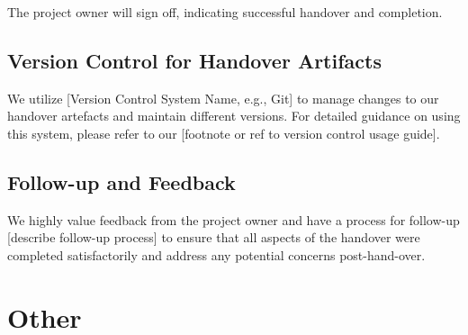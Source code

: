\documentclass[10pt]{projectdoc}
\begin{document}
The project owner will sign off, indicating successful handover and completion. 

\subsection{Version Control for Handover Artifacts}

We utilize [Version Control System Name, e.g., Git] to manage changes to our handover artefacts and maintain different versions. For detailed guidance on using this system, please refer to our [footnote or ref to version control usage guide].

\subsection{Follow-up and Feedback}

We highly value feedback from the project owner and have a process for follow-up [describe follow-up process] to ensure that all aspects of the handover were completed satisfactorily and address any potential concerns post-hand-over.

\section{Other}

\newpage



\end{document}

